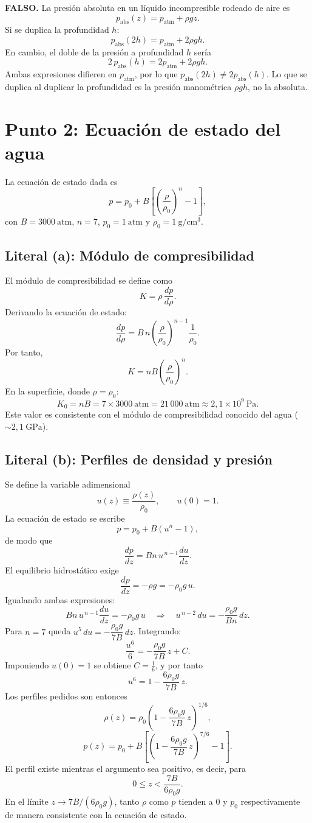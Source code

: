 \documentclass[a4paper]{article}
\begin{document}
\textbf{FALSO.} La presión absoluta en un líquido incompresible rodeado de aire es
$$
p_{\mathrm{abs}}(z)=p_{\mathrm{atm}}+\rho g z.
$$
Si se duplica la profundidad $h$:
$$
p_{\mathrm{abs}}(2h)=p_{\mathrm{atm}}+2\rho g h.
$$
En cambio, el doble de la presión a profundidad $h$ sería
$$
2\,p_{\mathrm{abs}}(h)=2p_{\mathrm{atm}}+2\rho g h.
$$
Ambas expresiones difieren en $p_{\mathrm{atm}}$, por lo que $p_{\mathrm{abs}}(2h)\ne 2p_{\mathrm{abs}}(h)$. Lo que se duplica al duplicar la profundidad es la presión manométrica $\rho g h$, no la absoluta.

\section{Punto 2: Ecuación de estado del agua}

La ecuación de estado dada es
$$
p=p_{0}+B\left[\left(\frac{\rho}{\rho_{0}}\right)^{n}-1\right],
$$
con $B=3000\ \mathrm{atm}$, $n=7$, $p_{0}=1\ \mathrm{atm}$ y $\rho_{0}=1\ \mathrm{g/cm^{3}}$.

\subsection{Literal (a): Módulo de compresibilidad}

El módulo de compresibilidad se define como
$$
K=\rho\,\frac{dp}{d\rho}.
$$
Derivando la ecuación de estado:
$$
\frac{dp}{d\rho}=B\,n\left(\frac{\rho}{\rho_{0}}\right)^{n-1}\frac{1}{\rho_{0}}.
$$
Por tanto,
$$
K=nB\left(\frac{\rho}{\rho_{0}}\right)^{n}.
$$
En la superficie, donde $\rho=\rho_{0}$:
$$
K_{0}=nB=7\times 3000\ \mathrm{atm}=21\,000\ \mathrm{atm}\approx 2{,}1\times 10^{9}\ \mathrm{Pa}.
$$
Este valor es consistente con el módulo de compresibilidad conocido del agua ($\sim 2{,}1\ \mathrm{GPa}$).

\subsection{Literal (b): Perfiles de densidad y presión}

Se define la variable adimensional
$$
u(z)\equiv \frac{\rho(z)}{\rho_{0}},\qquad u(0)=1.
$$
La ecuación de estado se escribe
$$
p=p_{0}+B(u^{n}-1),
$$
de modo que
$$
\frac{dp}{dz}=Bn\,u^{\,n-1}\frac{du}{dz}.
$$
El equilibrio hidrostático exige
$$
\frac{dp}{dz}=-\rho g=-\rho_{0}g\,u.
$$
Igualando ambas expresiones:
$$
Bn\,u^{\,n-1}\frac{du}{dz}=-\rho_{0}g\,u
\quad\Longrightarrow\quad
u^{\,n-2}\,du=-\frac{\rho_{0}g}{Bn}\,dz.
$$
Para $n=7$ queda $u^{5}\,du=-\dfrac{\rho_{0}g}{7B}\,dz$. Integrando:
$$
\frac{u^{6}}{6}=-\frac{\rho_{0}g}{7B}\,z+C.
$$
Imponiendo $u(0)=1$ se obtiene $C=\tfrac{1}{6}$, y por tanto
$$
u^{6}=1-\frac{6\rho_{0}g}{7B}\,z.
$$
Los perfiles pedidos son entonces
$$
\rho(z)=\rho_{0}\left(1-\frac{6\rho_{0}g}{7B}\,z\right)^{1/6},
$$
$$
p(z)=p_{0}+B\left[\left(1-\frac{6\rho_{0}g}{7B}\,z\right)^{7/6}-1\right].
$$
El perfil existe mientras el argumento sea positivo, es decir, para
$$
0\le z<\frac{7B}{6\rho_{0}g}.
$$
En el límite $z\to 7B/(6\rho_{0}g)$, tanto $\rho$ como $p$ tienden a $0$ y $p_{0}$ respectivamente de manera consistente con la ecuación de estado.
\end{document}
